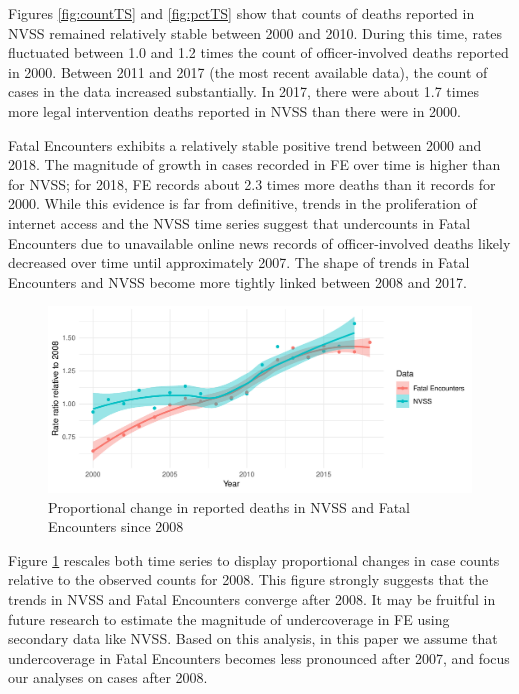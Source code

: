 \documentclass[9pt,twoside,lineno]{pnas-new}
\begin{document}
Figures \ref{fig:countTS} and \ref{fig:pctTS} show that counts of deaths reported in NVSS remained relatively stable between 2000 and 2010. During this time, rates fluctuated between 1.0 and 1.2 times the count of officer-involved deaths reported in 2000. Between 2011 and 2017 (the most recent available data), the count of cases in the data increased substantially. In 2017, there were about 1.7 times more legal intervention deaths reported in NVSS than there were in 2000. 

Fatal Encounters exhibits a relatively stable positive trend between 2000 and 2018. The magnitude of growth in cases recorded in FE over time is higher than for NVSS; for 2018, FE records about 2.3 times more deaths than it records for 2000. While this evidence is far from definitive, trends in the proliferation of internet access and the NVSS time series suggest that undercounts in Fatal Encounters due to unavailable online news records of officer-involved deaths likely decreased over time until approximately 2007. The shape of trends in Fatal Encounters and NVSS become more tightly linked between 2008 and 2017. 

\begin{figure}[H]
	\centering
	\includegraphics[width = \linewidth]{vis/nvss_fe_pct_08.pdf}
	\caption{Proportional change in reported deaths in NVSS and Fatal Encounters since 2008}
	\label{fig:pct_08}
\end{figure}

Figure \ref{fig:pct_08} rescales both time series to display proportional changes in case counts relative to the observed counts for 2008. This figure strongly suggests that the trends in NVSS and Fatal Encounters converge after 2008. It may be fruitful in future research to estimate the magnitude of undercoverage in FE using secondary data like NVSS. Based on this analysis, in this paper we assume that undercoverage in Fatal Encounters becomes less pronounced after 2007, and focus our analyses on cases after 2008. 
\end{document}
